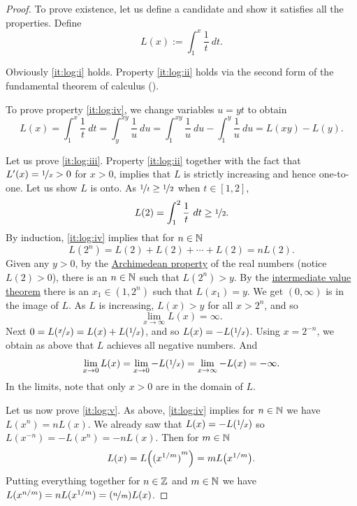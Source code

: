 \begin{proof}
To prove existence, let us define a candidate and show it satisfies
all the properties.  Define
\begin{equation*}
L(x) := \int_1^x \frac{1}{t}~dt .
\end{equation*}

Obviously \ref{it:log:i} holds.  Property \ref{it:log:ii} holds
via the second form of the fundamental theorem of calculus
().

To prove property \ref{it:log:iv},
we change variables $u=yt$ to obtain
\begin{equation*}
L(x) =
\int_1^{x} \frac{1}{t}~dt
=
\int_y^{xy} \frac{1}{u}~du
=
\int_1^{xy} \frac{1}{u}~du
-
\int_1^{y} \frac{1}{u}~du
=
L(xy)-L(y) .
\end{equation*}

Let us prove \ref{it:log:iii}.
Property \ref{it:log:ii} together with the fact that $L'(x) = \nicefrac{1}{x} > 0$ 
for $x > 0$, implies that $L$
is strictly increasing and hence one-to-one.
Let us show $L$ is onto.  
As $\nicefrac{1}{t} \geq \nicefrac{1}{2}$ when $t \in [1,2]$,
\begin{equation*}
L(2) = \int_1^2 \frac{1}{t} ~dt \geq \nicefrac{1}{2} .
\end{equation*}
By induction, \ref{it:log:iv} implies that for $n \in {\mathbb{N}}$
\begin{equation*}
L(2^n) = L(2) + L(2) + \cdots + L(2) = n L(2) .
\end{equation*}
Given any $y > 0$, 
by the \hyperref[thm:arch:i]{Archimedean property} of the real numbers
(notice $L(2) > 0$), there is an $n \in {\mathbb{N}}$ such that
$L(2^n) > y$.  By the
\hyperref[IVT:thm]{intermediate value theorem}
there is an $x_1 \in (1,2^n)$ such that $L(x_1) = y$.  We get
$(0,\infty)$ is in the image of $L$.
As $L$ is increasing, $L(x) > y$ for all $x > 2^n$, and so
\begin{equation*}
\lim_{x\to\infty} L(x) = \infty .
\end{equation*}
Next
$0 = L(\nicefrac{x}{x}) = L(x) + L(\nicefrac{1}{x})$, and
so $L(x) = - L(\nicefrac{1}{x})$.  Using $x=2^{-n}$, we obtain
as above that $L$ achieves all negative numbers.  And
\begin{equation*}
\lim_{x \to 0} L(x) = 
\lim_{x \to 0} -L(\nicefrac{1}{x})
=
\lim_{x \to \infty} -L(x)
=  - \infty .
\end{equation*}
In the limits, note that only $x > 0$ are in the domain of $L$.

Let us now prove \ref{it:log:v}.
As above, \ref{it:log:iv} implies for $n \in {\mathbb{N}}$ we have
$L(x^n) = n L(x)$.
We already saw that
$L(x) = - L(\nicefrac{1}{x})$
so $L(x^{-n}) = - L(x^n) = -n L(x)$.  Then for $m \in {\mathbb{N}}$
\begin{equation*}
L(x) = L\Bigl({(x^{1/m})}^m\Bigr) = m L\bigl(x^{1/m}\bigr) .
\end{equation*}
Putting everything together for $n \in {\mathbb{Z}}$ and $m \in {\mathbb{N}}$ we have
$L(x^{n/m}) = n L(x^{1/m}) = (\nicefrac{n}{m}) L(x)$.


\end{proof}

